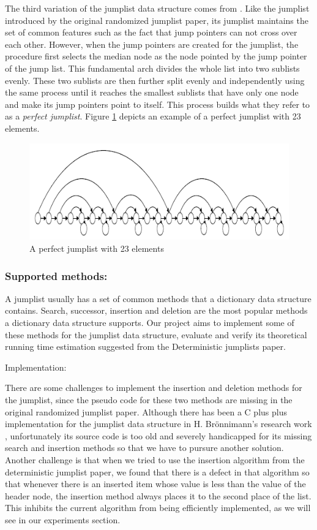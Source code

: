 \documentclass[oribibl]{llncs}
\begin{document}
The third variation of the jumplist data structure comes from \cite{ElmasryMarch2005}. Like the jumplist introduced by the original randomized jumplist paper, its jumplist maintains the set of common features such as the fact that jump pointers can not cross over each other. However, when the jump pointers are created for the jumplist, the procedure first selects the median node as the node pointed by the jump pointer of the jump list. This fundamental arch divides the whole list into two sublists evenly. These two sublists are then further split evenly and independently using the same process until it reaches the smallest sublists that have only one node and make its jump pointers point to itself. This process builds what they refer to as a {\it perfect jumplist}. Figure \ref{fig:jumplist} depicts an example of a perfect jumplist with 23 elements.


\begin{figure}[here]
\center
\includegraphics[width=12cm]{images/perfect_jumplist}
\caption{A perfect jumplist with 23 elements}
\label{fig:jumplist}
\end{figure}


\subsubsection{Supported methods:}

A jumplist usually has a set of common methods that a dictionary data structure contains. Search, successor, insertion and deletion are the most popular methods a dictionary data structure supports. Our project aims to implement some of these methods for the jumplist data structure, evaluate and verify its theoretical running time estimation suggested from the Deterministic jumplists paper.

Implementation:

There are some challenges to implement the insertion and deletion methods for the jumplist, since the pseudo code for these two methods are missing in the original randomized jumplist paper. Although there has been a C plus plus implementation for the jumplist data structure in H. Brönnimann’s research work \cite{Broennimann}, unfortunately its source code is too old and severely handicapped for its missing search and insertion methods so that we have to pursure another solution. Another challenge is that when we tried to use the insertion algorithm from the deterministic jumplist paper, we found that there is a defect in that algorithm so that whenever there is an inserted item whose value is less than the value of the header node, the insertion method always places it to the second place of the list. This inhibits the current algorithm from being efficiently implemented, as we will see in our experiments section.
\end{document}
